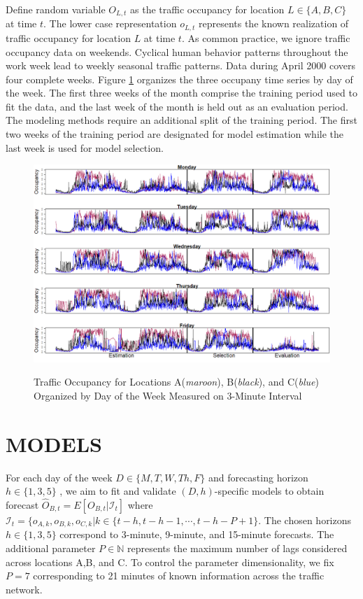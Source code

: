 Define random variable $O_{L,t}$ as the traffic occupancy for location $L \in\{A,B,C\}$ at time $t$. The lower case representation $o_{L,t}$ represents the known realization of traffic occupancy for location $L$ at time $t$. As common practice, we ignore traffic occupancy data on weekends. Cyclical human behavior patterns throughout the work week lead to weekly seasonal traffic patterns. Data during April 2000 covers four complete weeks. Figure \ref{fig:OrigPlotTrafficOcc} organizes the three occupany time series by day of the week. The first three weeks of the month comprise the training period used to fit the data, and the last week of the month is held out as an evaluation period. The modeling methods require an additional split of the training period. The first two weeks of the training period are designated for model estimation while the last week is used for model selection.

\begin{figure}[!h]
\caption{Traffic Occupancy for Locations A(\textit{maroon}), B(\textit{black}), and C(\textit{blue}) Organized by Day of the Week Measured on 3-Minute Interval }
\includegraphics[width=\textwidth]{OrigPlotTrafficOcc}
\label{fig:OrigPlotTrafficOcc}
\end{figure}







\section{MODELS}
\label{sec:models}
For each day of the week $D\in\{M,T,W,Th,F\}$ and forecasting horizon $h \in \{1,3,5\}$ , we aim to fit and validate $(D,h)$-specific models to obtain forecast $\widehat{O}_{B,t}=E[O_{B,t}|\mathcal{I}_t]$ where $\mathcal{I}_t=\{o_{A,k},o_{B,k},o_{C,k}|k\in\{t-h,t-h-1,\cdots,t-h-P+1\}$.  The chosen horizons  $h \in \{1,3,5\}$ correspond to 3-minute, 9-minute, and 15-minute forecasts. The additional parameter $P\in\mathbb{N}$ represents the maximum number of lags considered across locations A,B, and C. To control the parameter dimensionality, we fix $P=7$ corresponding to 21 minutes of known information across the traffic network. 

